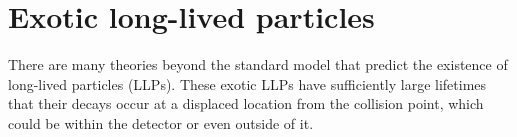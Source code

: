 


\section{Exotic long-lived particles}

There are many theories beyond the standard model that predict the existence of 
long-lived particles (LLPs). These exotic LLPs have sufficiently large 
lifetimes that their decays occur at a displaced location from the collision 
point, which could be within the detector or even outside of it. 

